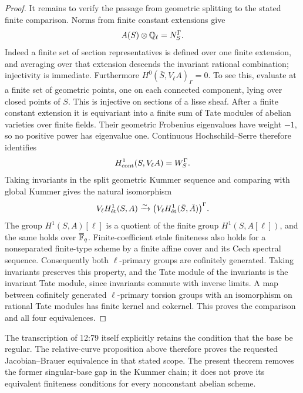 \begin{proof}
It remains to verify the passage from geometric splitting to the
stated finite comparison.  Norms from finite constant extensions
give
\[
 A(S)\otimes\mathbb Q_\ell=N_S^\Gamma.
\]
Indeed a finite set of section representatives is defined over
one finite extension, and averaging over that extension descends
the invariant rational combination; injectivity is immediate.
Furthermore
\(H^0(\bar S,V_\ell A)_\Gamma=0\).  To see this,
evaluate at a finite set of geometric points, one on each
connected component, lying over closed points of \(S\).
This is injective on sections of a lisse sheaf.  After a finite
constant extension it is equivariant into a finite sum of Tate
modules of abelian varieties over finite fields.  Their
geometric Frobenius eigenvalues have weight \(-1\), so no
positive power has eigenvalue one.  Continuous
Hochschild--Serre therefore identifies
\[
 H^1_{\mathrm{cont}}(S,V_\ell A)=W_S^\Gamma.
\]
Taking invariants in the split geometric Kummer sequence and
comparing with global Kummer gives the natural isomorphism
\[
 V_\ell H^1_{\mathrm{\acute et}}(S,A)
 \xrightarrow{\sim}
 \bigl(V_\ell H^1_{\mathrm{\acute et}}(\bar S,\bar A)\bigr)^\Gamma.
\]
The group \(H^1(S,A)[\ell]\) is a quotient of the finite
group \(H^1(S,A[\ell])\), and the same holds over
\(\overline{\mathbb F}_q\).  Finite-coefficient etale finiteness
also holds for a nonseparated finite-type scheme by a finite
affine cover and its Cech spectral sequence.  Consequently both
\(\ell\)-primary groups are cofinitely generated.  Taking
invariants preserves this property, and the Tate module of the
invariants is the invariant Tate module, since invariants commute
with inverse limits.  A map between cofinitely generated
\(\ell\)-primary torsion groups with an isomorphism on
rational Tate modules has finite kernel and cokernel.  This proves
the comparison and all four equivalences.
\end{proof}

The transcription of 12:79 itself explicitly retains the condition
that the base be regular.  The relative-curve proposition above
therefore proves the requested Jacobian--Brauer equivalence in
that stated scope.  The present theorem removes the former
singular-base gap in the Kummer chain; it does not prove its
equivalent finiteness conditions for every nonconstant abelian
scheme.
